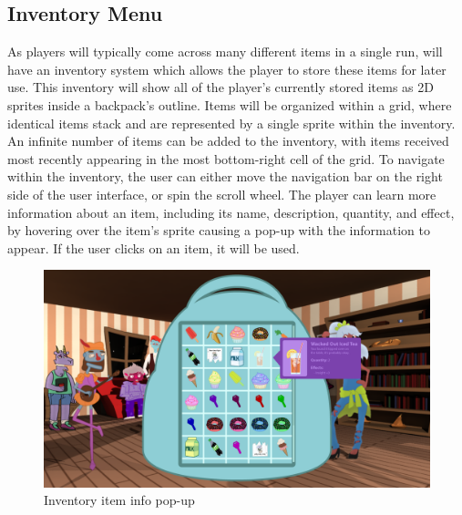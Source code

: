 \subsection{Inventory Menu}
\label{sec:inventory}
As players will typically come across many different items in a single run, \ourgame{} will have an inventory system which allows the player to store these items for later use. This inventory will show all of the player's currently stored items as 2D sprites inside a backpack's outline. Items will be organized within a grid, where identical items stack and are represented by a single sprite within the inventory. An infinite number of items can be added to the inventory, with items received most recently appearing in the most bottom-right cell of the grid. To navigate within the inventory, the user can either move the navigation bar on the right side of the user interface, or spin the scroll wheel. The player can learn more information about an item, including its name, description, quantity, and effect, by hovering over the item's sprite causing a pop-up with the information to appear. If the user clicks on an item, it will be used.

\begin{figure}[htb]
\centering
\includegraphics[width=.6\linewidth]{images/grid_Hovered}
\caption{Inventory item info pop-up}
\label{fig:inventory_grid_hovered}
\end{figure}
